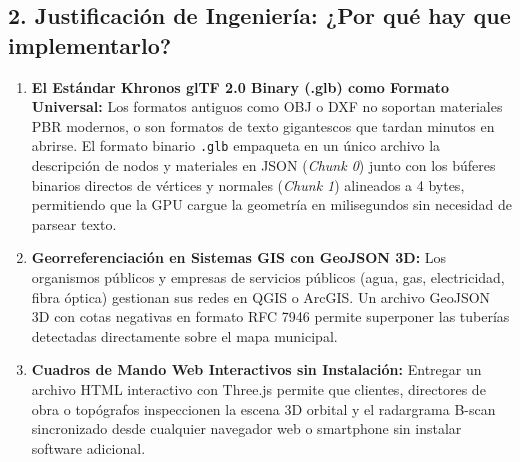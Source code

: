 \documentclass[11pt,a4paper]{article}
\begin{document}
\subsection{2. Justificación de Ingeniería: ¿Por qué hay que implementarlo?}
\begin{enumerate}
    \item \textbf{El Estándar Khronos glTF 2.0 Binary (.glb) como Formato Universal:}
    Los formatos antiguos como OBJ o DXF no soportan materiales PBR modernos, o son formatos de texto gigantescos que tardan minutos en abrirse. El formato binario \texttt{.glb} empaqueta en un único archivo la descripción de nodos y materiales en JSON (\textit{Chunk 0}) junto con los búferes binarios directos de vértices y normales (\textit{Chunk 1}) alineados a 4 bytes, permitiendo que la GPU cargue la geometría en milisegundos sin necesidad de parsear texto.
    \item \textbf{Georreferenciación en Sistemas GIS con GeoJSON 3D:}
    Los organismos públicos y empresas de servicios públicos (agua, gas, electricidad, fibra óptica) gestionan sus redes en QGIS o ArcGIS. Un archivo GeoJSON 3D con cotas negativas en formato RFC 7946 permite superponer las tuberías detectadas directamente sobre el mapa municipal.
    \item \textbf{Cuadros de Mando Web Interactivos sin Instalación:}
    Entregar un archivo HTML interactivo con Three.js permite que clientes, directores de obra o topógrafos inspeccionen la escena 3D orbital y el radargrama B-scan sincronizado desde cualquier navegador web o smartphone sin instalar software adicional.
\end{enumerate}
\end{document}
